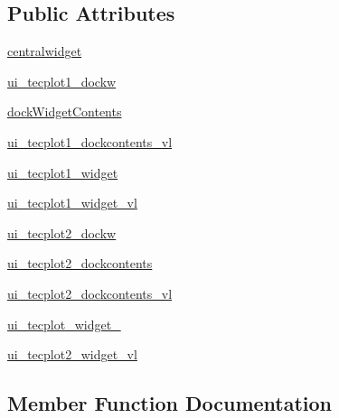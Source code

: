 \subsection*{Public Attributes}
\begin{DoxyCompactItemize}
\item 
\hyperlink{classtecplot__modules_1_1tecplot__display_u_i_1_1_ui___main_window_a8806355d8f5b1e79e73c21d82b2a02b1}{centralwidget}
\item 
\hyperlink{classtecplot__modules_1_1tecplot__display_u_i_1_1_ui___main_window_a5bc16af243ddcb715ac4dca3eaeea83f}{ui\+\_\+tecplot1\+\_\+dockw}
\item 
\hyperlink{classtecplot__modules_1_1tecplot__display_u_i_1_1_ui___main_window_a5f2617d5cf96b7f5c5eab71716630e9f}{dock\+Widget\+Contents}
\item 
\hyperlink{classtecplot__modules_1_1tecplot__display_u_i_1_1_ui___main_window_a669ef5be286de5a4683863273aea2117}{ui\+\_\+tecplot1\+\_\+dockcontents\+\_\+vl}
\item 
\hyperlink{classtecplot__modules_1_1tecplot__display_u_i_1_1_ui___main_window_a0e12cc099f3392ddc5763b2e11735c65}{ui\+\_\+tecplot1\+\_\+widget}
\item 
\hyperlink{classtecplot__modules_1_1tecplot__display_u_i_1_1_ui___main_window_a29ec621d9a4d64b9ac2741603bfd4c0b}{ui\+\_\+tecplot1\+\_\+widget\+\_\+vl}
\item 
\hyperlink{classtecplot__modules_1_1tecplot__display_u_i_1_1_ui___main_window_a39ab796d26cd8af1d7b08a1af13f18d3}{ui\+\_\+tecplot2\+\_\+dockw}
\item 
\hyperlink{classtecplot__modules_1_1tecplot__display_u_i_1_1_ui___main_window_afcc75b6eb098b33d244b16c759c2b0fd}{ui\+\_\+tecplot2\+\_\+dockcontents}
\item 
\hyperlink{classtecplot__modules_1_1tecplot__display_u_i_1_1_ui___main_window_a8883278a682ade2e54c270ba2064a3d8}{ui\+\_\+tecplot2\+\_\+dockcontents\+\_\+vl}
\item 
\hyperlink{classtecplot__modules_1_1tecplot__display_u_i_1_1_ui___main_window_adf880d85360d7fc4761f74c7ab80e09f}{ui\+\_\+tecplot\+\_\+widget\+\_}
\item 
\hyperlink{classtecplot__modules_1_1tecplot__display_u_i_1_1_ui___main_window_a3b0bcb24fdafc82b684e59b018c76ba9}{ui\+\_\+tecplot2\+\_\+widget\+\_\+vl}
\end{DoxyCompactItemize}


\subsection{Member Function Documentation}
\hypertarget{classtecplot__modules_1_1tecplot__display_u_i_1_1_ui___main_window_ae1811975426f7bbfcbe9bd6ae8a4d444}{}\label{classtecplot__modules_1_1tecplot__display_u_i_1_1_ui___main_window_ae1811975426f7bbfcbe9bd6ae8a4d444} 
